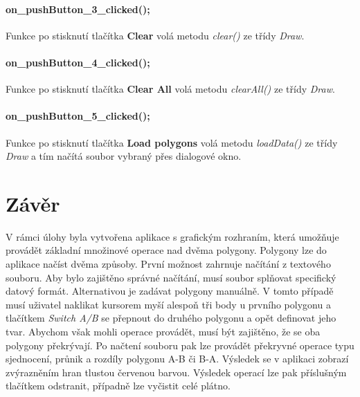 \documentclass[11pt]{article}
\begin{document}
\paragraph{on\_pushButton\_3\_clicked();}
Funkce po stisknutí tlačítka \textbf{Clear} volá metodu \textit{clear()} ze třídy \textit{Draw}. 

\paragraph{on\_pushButton\_4\_clicked();}
Funkce po stisknutí tlačítka \textbf{Clear All} volá metodu \textit{clearAll()} ze třídy \textit{Draw}. 

\paragraph{on\_pushButton\_5\_clicked();}
Funkce po stisknutí tlačítka \textbf{Load polygons} volá metodu \textit{loadData()} ze třídy \textit{Draw} a tím načítá soubor vybraný přes dialogové okno.


\section{Závěr}
V rámci úlohy byla vytvořena aplikace s grafickým rozhraním, která umožňuje provádět základní množinové operace nad dvěma polygony. Polygony lze do aplikace načíst dvěma způsoby. První možnost zahrnuje načítání z textového souboru. Aby bylo zajištěno správné načítání, musí soubor splňovat specifický datový formát. Alternativou je zadávat polygony manuálně. V tomto případě musí uživatel naklikat kursorem myší alespoň tři body u prvního polygonu a tlačítkem \textit{Switch A/B} se přepnout do druhého polygonu a opět definovat jeho tvar. Abychom však mohli operace provádět, musí být zajištěno, že se oba polygony překrývají. Po načtení souboru pak lze provádět překryvné operace typu sjednocení, průnik a rozdíly polygonu A-B či B-A. Výsledek se v aplikaci zobrazí zvýrazněním hran tlustou červenou barvou. Výsledek operací lze pak příslušným tlačítkem odstranit, případně lze vyčistit celé plátno.
\end{document}
